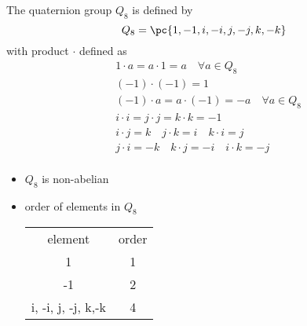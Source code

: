 \documentclass[11pt]{article}
\begin{document}
\section{}


\begin{definition*}
     The quaternion group $Q_8$ is defined by 
    \[
        Q_8 = \pc{
            1, -1, i, -i, j, -j, k, -k
        }    
    \]
    with product $\cdot$ defined as 
    \begin{align*}
        &1 \cdot a = a \cdot 1 = a \quad \forall a\in Q_8 \\ 
        &(-1) \cdot (-1) = 1 \\ 
        &(-1) \cdot a = a \cdot (-1) = -a \quad \forall a\in Q_8 \\ 
        &i \cdot i = j \cdot j = k \cdot k = -1 \\
        &i\cdot j = k \quad j \cdot k = i \quad k \cdot i = j \\ 
        &j\cdot i = -k \quad k \cdot j = -i \quad i \cdot k = -j \\ 
    \end{align*}
    \begin{itemize}
        \item {} $Q_8$ is non-abelian
        \item {} order of elements in $Q_8$
        \begin{center}
            \begin{tabular}{c|c}
                element & order \\
                1 & 1 \\
                -1 & 2 \\ 
                i, -i, j, -j, k,-k & 4 \\
            \end{tabular}
        \end{center}
    \end{itemize}
\end{definition*}


\section{}
\end{document}
